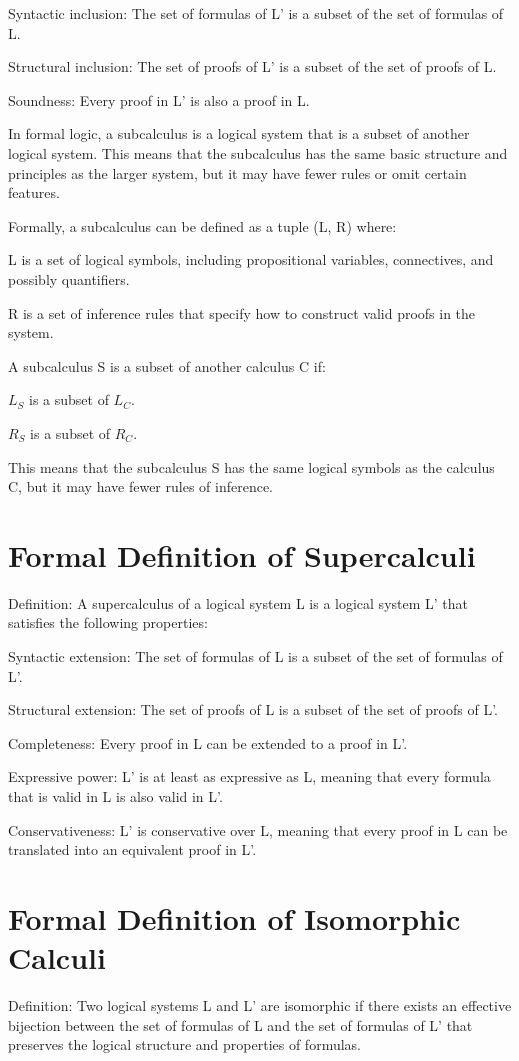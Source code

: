 Syntactic inclusion: The set of formulas of L' is a subset of the set of formulas of L.

Structural inclusion: The set of proofs of L' is a subset of the set of proofs of L.

Soundness: Every proof in L' is also a proof in L.


In formal logic, a subcalculus is a logical system that is a subset of another logical system. This means that the subcalculus has the same basic structure and principles as the larger system, but it may have fewer rules or omit certain features.

Formally, a subcalculus can be defined as a tuple (L, R) where:

L is a set of logical symbols, including propositional variables, connectives, and possibly quantifiers.

R is a set of inference rules that specify how to construct valid proofs in the system.

A subcalculus S is a subset of another calculus C if:

$ L_S $ is a subset of $ L_C $.

$ R_S $ is a subset of $ R_C $.

This means that the subcalculus S has the same logical symbols as the calculus C, but it may have fewer rules of inference.

\section{Formal Definition of Supercalculi}
Definition: A supercalculus of a logical system L is a logical system L' that satisfies the following properties:

Syntactic extension: The set of formulas of L is a subset of the set of formulas of L'.

Structural extension: The set of proofs of L is a subset of the set of proofs of L'.

Completeness: Every proof in L can be extended to a proof in L'.

Expressive power: L' is at least as expressive as L, meaning that every formula that is valid in L is also valid in L'.

Conservativeness: L' is conservative over L, meaning that every proof in L can be translated into an equivalent proof in L'.


\section{Formal Definition of Isomorphic Calculi}
Definition: Two logical systems L and L' are isomorphic if there exists an effective bijection between the set of formulas of L and the set of formulas of L' that preserves the logical structure and properties of formulas. 

